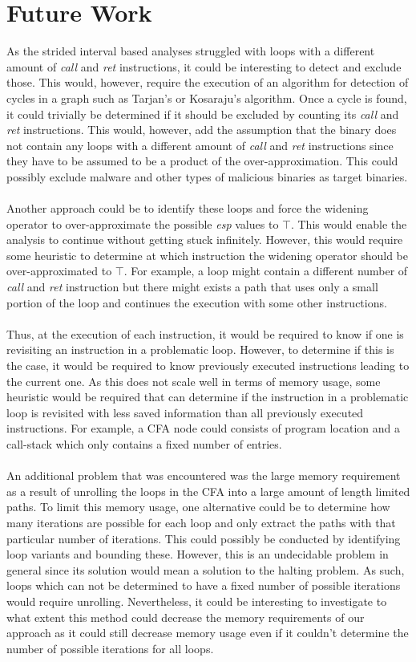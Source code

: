 \documentclass{kththesis}
\newcommand{\fbcomment}[1]{{#1}}
\renewcommand{\fbcomment}[1]{}
\renewcommand{\it}[1]{\textit{#1}}
\begin{document}
\section{Future Work}
\fbcomment{\color{red}Goal: Describe how the work in this thesis can be extended.}
As the strided interval based analyses struggled with loops with a different amount of \it{call} and \it{ret} instructions, it could be interesting to detect and exclude those. This would, however, require the execution of an algorithm for detection of cycles in a graph such as Tarjan's or Kosaraju's algorithm. Once a cycle is found, it could trivially be determined if it should be excluded by counting its \it{call} and \it{ret} instructions. This would, however, add the assumption that the binary does not contain any loops with a different amount of \it{call} and \it{ret} instructions since they have to be assumed to be a product of the over-approximation. This could possibly exclude malware and other types of malicious binaries as target binaries.
\\ \\
Another approach could be to identify these loops and force the widening operator to over-approximate the possible \it{esp} values to $\top$. This would enable the analysis to continue without getting stuck infinitely. However, this would require some heuristic to determine at which instruction the widening operator should be over-approximated to $\top$. For example, a loop might contain a different number of \it{call} and \it{ret} instruction but there might exists a path that uses only a small portion of the loop and continues the execution with some other instructions. 
\\ \\
Thus, at the execution of each instruction, it would be required to know if one is revisiting an instruction in a problematic loop. However, to determine if this is the case, it would be required to know previously executed instructions leading to the current one. As this does not scale well in terms of memory usage, some heuristic would be required that can determine if the instruction in a problematic loop is revisited with less saved information than all previously executed instructions. For example, a CFA node could consists of program location and a call-stack which only contains a fixed number of entries.
\\ \\
An additional problem that was encountered was the large memory requirement as a result of unrolling the loops in the CFA into a large amount of length limited paths. To limit this memory usage, one alternative could be to determine how many iterations are possible for each loop and only extract the paths with that particular number of iterations. This could possibly be conducted by identifying loop variants and bounding these. However, this is an undecidable problem in general since its solution would mean a solution to the halting problem. As such, loops which can not be determined to have a fixed number of possible iterations would require unrolling. Nevertheless, it could be interesting to investigate to what extent this method could decrease the memory requirements of our approach as it could still decrease memory usage even if it couldn't determine the number of possible iterations for all loops.
\end{document}
